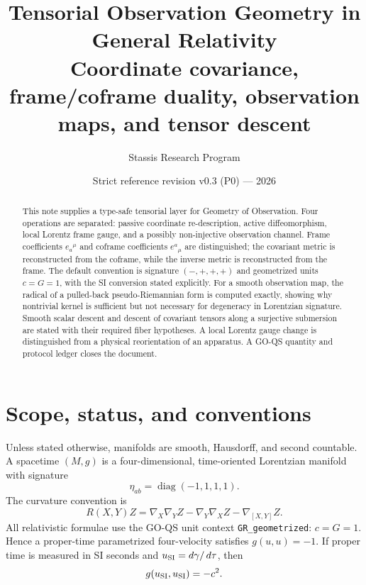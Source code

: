 \documentclass[11pt,a4paper]{article}
\title{\bfseries Tensorial Observation Geometry in General Relativity\\
\large Coordinate covariance, frame/coframe duality, observation maps, and tensor descent}
\author{Stassis Research Program}
\date{Strict reference revision v0.3 (P0) --- 2026}
\theoremstyle{definition}
\theoremstyle{plain}
\theoremstyle{remark}
\newcommand{\dd}{\mathop{}\!d}
\begin{document}
\maketitle

\begin{center}
\end{center}

\begin{abstract}
This note supplies a type-safe tensorial layer for Geometry of Observation.
Four operations are separated: passive coordinate re-description, active
diffeomorphism, local Lorentz frame gauge, and a possibly non-injective
observation channel. Frame coefficients $e_a{}^\mu$ and coframe coefficients
$e^a{}_\mu$ are distinguished; the covariant metric is reconstructed from
the coframe, while the inverse metric is reconstructed from the frame.
The default convention is signature $(-,+,+,+)$ and geometrized units
$c=G=1$, with the SI conversion stated explicitly. For a smooth observation
map, the radical of a pulled-back pseudo-Riemannian form is computed exactly,
showing why nontrivial kernel is sufficient but not necessary for degeneracy
in Lorentzian signature. Smooth scalar descent and descent of covariant
tensors along a surjective submersion are stated with their required
fiber hypotheses. A local Lorentz gauge change is distinguished from a
physical reorientation of an apparatus. A GO-QS quantity and protocol ledger
closes the document.
\end{abstract}

\tableofcontents

\section{Scope, status, and conventions}

Unless stated otherwise, manifolds are smooth, Hausdorff, and second
countable. A spacetime $(M,g)$ is a four-dimensional, time-oriented
Lorentzian manifold with signature
\[
\eta_{ab}=\operatorname{diag}(-1,1,1,1).
\]
The curvature convention is
\[
R(X,Y)Z
=\nabla_X\nabla_YZ-\nabla_Y\nabla_XZ-\nabla_{[X,Y]}Z.
\]
All relativistic formulae use the GO-QS unit context
\texttt{GR\_geometrized}: $c=G=1$. Hence a proper-time parametrized
four-velocity satisfies $g(u,u)=-1$. If proper time is measured in SI
seconds and $u_{\rm SI}=\dd\gamma/\dd\tau$, then
\[
g(u_{\rm SI},u_{\rm SI})=-c^2.
\]
\end{document}
